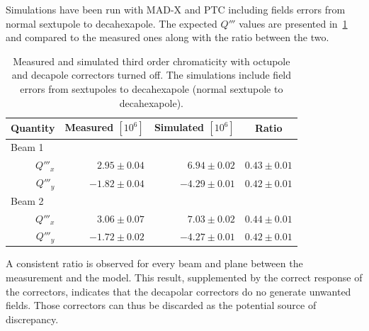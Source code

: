 Simulations have been run with MAD-X and PTC including fields errors from normal sextupole to 
decahexapole. The expected $Q'''$ values are presented
in~\cref{table:decapoles:bare_chromaticity:virgin_dq3} and compared to the measured ones along with
the ratio between the two.

\begin{table}[tbh]
    \centering
    \begin{tabular}{rrrc}
    \hline
        \toprule
        Quantity  &  Measured $[10^6]$        &  Simulated $[10^{6}]$          &   Ratio       \\
        \midrule
        \multicolumn{1}{l}{Beam 1}    &                           &                                &               \\
         $Q'''_x$ &     $ 2.95 \pm 0.04$      &       $ 6.94 \pm 0.02$         &  $0.43 \pm 0.01$\\
         $Q'''_y$ &     $-1.82 \pm 0.04$      &       $-4.29 \pm 0.01$         &  $0.42 \pm 0.01$\\
        \multicolumn{1}{l}{Beam 2}    &                           &                                &               \\
         $Q'''_x$ &     $ 3.06 \pm 0.07$      &       $ 7.03 \pm 0.02$         &  $0.44 \pm 0.01$\\
         $Q'''_y$ &     $-1.72 \pm 0.02$      &       $-4.27 \pm 0.01$         &  $0.42 \pm 0.01$\\
         \bottomrule
    \end{tabular}
    \caption{Measured and simulated third order chromaticity with octupole and decapole correctors
    turned off. The simulations include field errors from sextupoles to decahexapole (normal
    sextupole to decahexapole).}
    \label{table:decapoles:bare_chromaticity:virgin_dq3}
\end{table}

A consistent ratio is observed for every beam and plane between the measurement and the model. This
result, supplemented by the correct response of the correctors, indicates that the decapolar
correctors do no generate unwanted fields. Those correctors can thus be discarded as the potential
source of discrepancy.